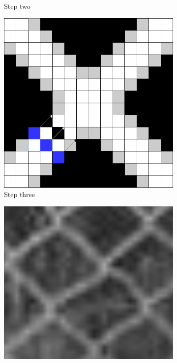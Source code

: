 \documentclass[../Head/Main.tex]{subfiles}
\begin{document}
\begin{figure}[H]
\begin{subfigure}{.22\textwidth}
        \caption{Step two}
        \label{fig:line_search_step2}
    \end{subfigure}
    \hfill
    \begin{subfigure}{.22\textwidth}
        \centering
        \includegraphics[width=\textwidth]{../Figures/screening_algorithm/line_search_step3.png}
        \caption{Step three}
        \label{fig:line_search_step3}
    \end{subfigure}
    \hfill
    \begin{subfigure}{.245\textwidth}
        \centering
        \includegraphics[width=\textwidth]{../Figures/screening_algorithm/abnormal_fance_structure.png}

\end{subfigure}
\end{figure}
\end{document}
